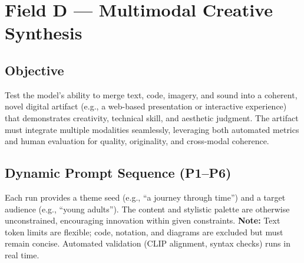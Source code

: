 \section{Field D — Multimodal Creative Synthesis}
\label{sec:fieldD}

\subsection*{Objective}
Test the model’s ability to merge text, code, imagery, and sound into a coherent, novel digital artifact (e.g., a web-based presentation or interactive experience) that demonstrates creativity, technical skill, and aesthetic judgment. The artifact must integrate multiple modalities seamlessly, leveraging both automated metrics and human evaluation for quality, originality, and cross-modal coherence.

\subsection*{Dynamic Prompt Sequence (P1–P6)}
Each run provides a theme seed (e.g., “a journey through time”) and a target audience (e.g., “young adults”). The content and stylistic palette are otherwise unconstrained, encouraging innovation within given constraints.  
\textbf{Note:} Text token limits are flexible; code, notation, and diagrams are excluded but must remain concise. Automated validation (CLIP alignment, syntax checks) runs in real time.

